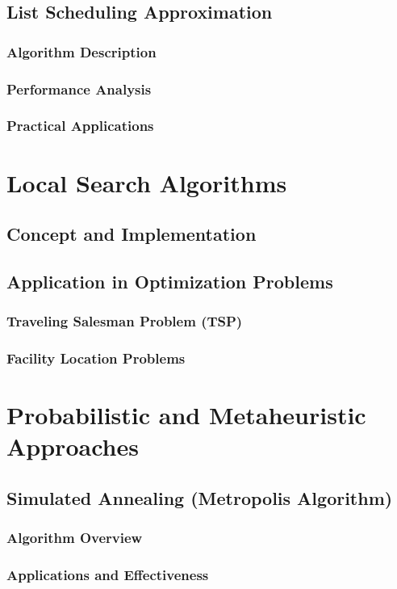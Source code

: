 \documentclass[12pt]{book} %
\begin{document}
\subsection{List Scheduling Approximation}
\subsubsection{Algorithm Description}
\subsubsection{Performance Analysis}
\subsubsection{Practical Applications}

\section{Local Search Algorithms}
\subsection{Concept and Implementation}
\subsection{Application in Optimization Problems}
\subsubsection{Traveling Salesman Problem (TSP)}
\subsubsection{Facility Location Problems}

\section{Probabilistic and Metaheuristic Approaches}
\subsection{Simulated Annealing (Metropolis Algorithm)}
\subsubsection{Algorithm Overview}
\subsubsection{Applications and Effectiveness}
\end{document}
